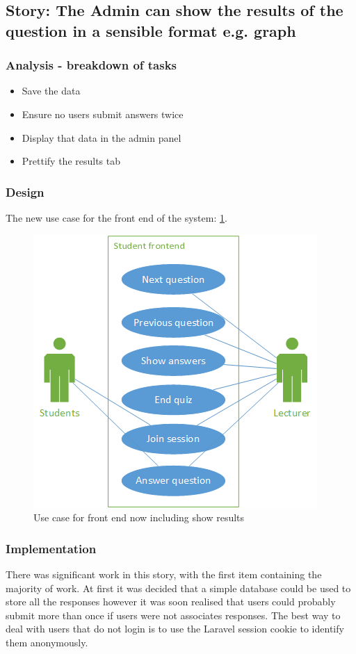 \subsection{Story: The Admin can show the results of the question in a sensible format e.g. graph}
\subsubsection{Analysis - breakdown of tasks}
\begin{itemize}
	\item Save the data
	\item Ensure no users submit answers twice
	\item Display that data in the admin panel
	\item Prettify the results tab
\end{itemize}
\subsubsection{Design}
The new use case for the front end of the system: \ref{fig:iter-6-frontend-use-case}.
\begin{figure}[H]
	\caption{Use case for front end now including show results}
	\centerline{\includegraphics{Chapter2/Iter-6/iter-6-frontend-use-case}}
	\label{fig:iter-6-frontend-use-case}
\end{figure}
\subsubsection{Implementation}
There was significant work in this story, with the first item containing the majority of work. At first it was decided that a simple database could be used to store all the responses however it was soon realised that users could probably submit more than once if users were not associates responses. The best way to deal with users that do not login is to use the Laravel session cookie to identify them anonymously.

